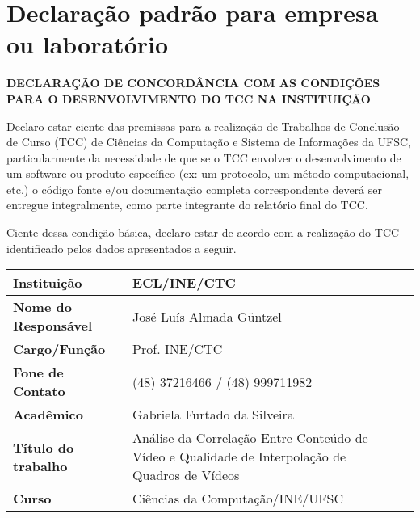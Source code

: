 \chapter{Declaração padrão para empresa ou laboratório}
\begin{snugshade}

	\begin{center}
		{\textbf{DECLARAÇÃO DE CONCORDÂNCIA COM AS CONDIÇÕES PARA O DESENVOLVIMENTO DO TCC NA INSTITUIÇÃO}}
	\end{center}

\end{snugshade}

\vspace{10pt}

Declaro estar ciente das premissas para a realização de Trabalhos de Conclusão de Curso (TCC) de Ciências da Computação e Sistema de In\-for\-ma\-ções da UFSC, particularmente da necessidade de que se o TCC envolver o desenvolvimento de um software ou produto específico (ex: um protocolo, um método computacional, etc.) o código fonte e/ou documentação completa correspondente deverá ser entregue integralmente, como parte integrante do relatório final do TCC.

Ciente dessa condição básica, declaro estar de acordo com a realização do TCC identificado pelos dados apresentados a seguir.

\vspace{20pt}


\begin{tabular}{|l|X p{8cm}|}
	\hline
	\textbf{Instituição}         & ECL/INE/CTC                                                                                    \\ \hline
	\textbf{Nome do Responsável} & José Luís Almada G{\"u}ntzel                                                                   \\ \hline
	\textbf{Cargo/Função}        & Prof. INE/CTC                                                                                  \\ \hline
	\textbf{Fone de Contato}     & (48) 37216466 / (48) 999711982                                                                 \\ \hline
	\textbf{Acadêmico}           & Gabriela Furtado da Silveira                                                                   \\ \hline
	\textbf{Título do trabalho}  & Análise da Correlação Entre Conteúdo de Vídeo e Qualidade de Interpolação de Quadros de Vídeos
	\\ \hline
	\textbf{Curso}               & Ciências da Computação/INE/UFSC                                                                \\ \hline

\end{tabular}

